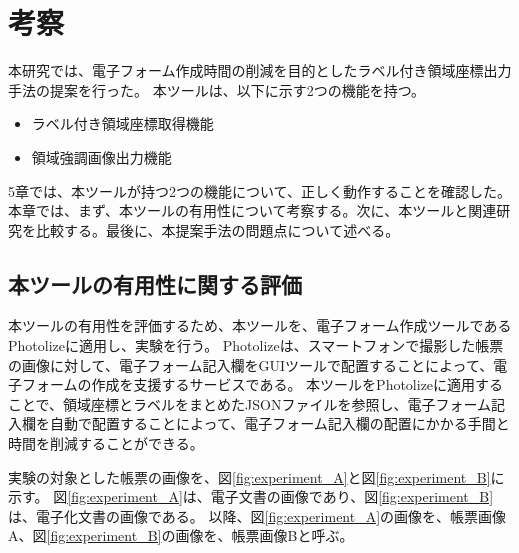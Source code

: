 \chapter{考察}\label{cha:Discussion}
本研究では、電子フォーム作成時間の削減を目的としたラベル付き領域座標出力手法の提案を行った。
本ツールは、以下に示す2つの機能を持つ。

\begin{itemize}
  \item ラベル付き領域座標取得機能
  \item 領域強調画像出力機能
\end{itemize}

5章では、本ツールが持つ2つの機能について、正しく動作することを確認した。
本章では、まず、本ツールの有用性について考察する。次に、本ツールと関連研究を比較する。最後に、本提案手法の問題点について述べる。

\section{本ツールの有用性に関する評価}\label{sec:evalue_usefulness}
本ツールの有用性を評価するため、本ツールを、電子フォーム作成ツールであるPhotolize\cite{Photolize}に適用し、実験を行う。
Photolizeは、スマートフォンで撮影した帳票の画像に対して、電子フォーム記入欄をGUIツールで配置することによって、電子フォームの作成を支援するサービスである。
本ツールをPhotolizeに適用することで、領域座標とラベルをまとめたJSONファイルを参照し、電子フォーム記入欄を自動で配置することによって、電子フォーム記入欄の配置にかかる手間と時間を削減することができる。

実験の対象とした帳票の画像を、図\ref{fig:experiment_A}と図\ref{fig:experiment_B}に示す。
図\ref{fig:experiment_A}は、電子文書の画像であり、図\ref{fig:experiment_B}は、電子化文書の画像である。
以降、図\ref{fig:experiment_A}の画像を、帳票画像A、図\ref{fig:experiment_B}の画像を、帳票画像Bと呼ぶ。

